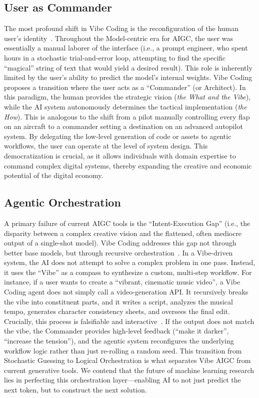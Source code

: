 \documentclass{article}
\begin{document}
\subsection{User as Commander}
The most profound shift in Vibe Coding is the reconfiguration of the human user’s identity~\citep{Chen2025ScreenReader}. Throughout the Model-centric era for AIGC, the user was essentially a manual laborer of the interface (i.e., a prompt engineer, who spent hours in a stochastic trial-and-error loop, attempting to find the specific ``magical'' string of text that would yield a desired result). This role is inherently limited by the user’s ability to predict the model’s internal weights.
Vibe Coding proposes a transition where the user acts as a ``Commander'' (or Architect). In this paradigm, the human provides the strategic vision (\textit{the What and the Vibe}), while the AI system autonomously determines the tactical implementation (\textit{the How}). This is analogous to the shift from a pilot manually controlling every flap on an aircraft to a commander setting a destination on an advanced autopilot system. By delegating the low-level generation of code or assets to agentic workflows, the user can operate at the level of system design. 
{This democratization is crucial, as it allows individuals with domain expertise to command complex digital systems, thereby expanding the creative and economic potential of the digital economy}.


\subsection{Agentic Orchestration}
A primary failure of current AIGC tools is the ``Intent-Execution Gap'' (i.e., the disparity between a complex creative vision and the flattened, often mediocre output of a single-shot model).
Vibe Coding addresses this gap not through better base models, but through recursive orchestration~\citep{dang2025multi}.
In a Vibe-driven system, the AI does not attempt to solve a complex problem in one pass. Instead, it uses the ``Vibe'' as a compass to synthesize a custom, multi-step workflow. For instance, if a user wants to create a ``vibrant, cinematic music video'', a Vibe Coding agent does not simply call a video-generation API. It recursively breaks the vibe into constituent parts, and it writes a script, analyzes the musical tempo, generates character consistency sheets, and oversees the final edit.
Crucially, this process is falsifiable and interactive~\citep{qiang2025mle, park2023generative}. If the output does not match the vibe, the Commander provides high-level feedback (``make it darker'', ``increase the tension''), and the agentic system reconfigures the underlying workflow logic rather than just re-rolling a random seed.
{This transition from Stochastic Guessing to Logical Orchestration is what separates Vibe AIGC from current generative tools. We contend that the future of machine learning research lies in perfecting this orchestration layer—enabling AI to not just predict the next token, but to construct the next solution.}
\end{document}
